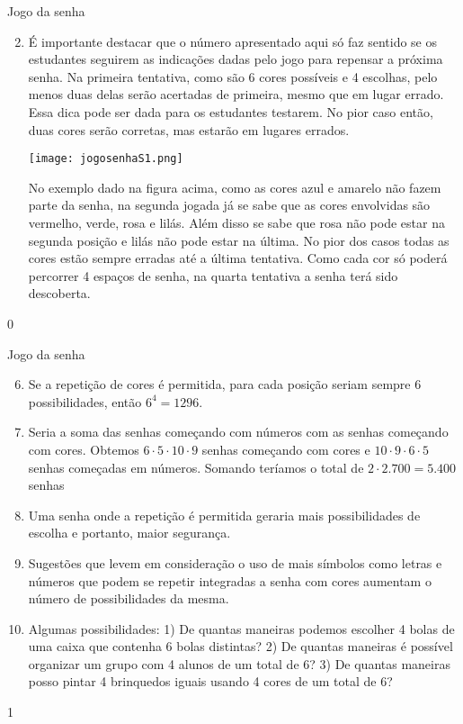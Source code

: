 \begin{answer}{Jogo da senha}
{
\begin{enumerate}\setcounter{enumi}{1}
\item É importante destacar que o número apresentado aqui só faz sentido se os estudantes seguirem as indicações dadas pelo jogo para repensar a próxima senha. 
Na primeira tentativa, como são 6 cores possíveis e 4 escolhas, pelo menos duas delas serão acertadas de primeira, mesmo que em lugar errado. Essa dica pode ser dada para os estudantes testarem. No pior caso então, duas cores serão corretas, mas estarão em lugares errados.

\begin{center}
\texttt{[image: jogosenhaS1.png]}
\end{center}
No exemplo dado na figura acima, como as cores azul e amarelo não fazem parte da senha, na segunda jogada já se sabe que as cores envolvidas são vermelho, verde, rosa e lilás. Além disso se sabe que rosa não pode estar na segunda posição e lilás não pode estar na última. No pior dos casos todas as cores estão sempre erradas até a última tentativa. Como cada cor só poderá percorrer 4 espaços de senha, na quarta tentativa a senha terá sido descoberta. 
\end{enumerate}
}{0}
\end{answer}
\clearmargin
\begin{answer}{Jogo da senha}
{
\begin{enumerate}\setcounter{enumi}{5}
\item Se a repetição de cores é permitida, para cada posição seriam sempre 6 possibilidades, então $6^4=1296.$

\item Seria a soma das senhas começando com números com as senhas começando com cores. Obtemos  $6 \cdot 5 \cdot  10 \cdot 9 $ senhas começando com cores e $10 \cdot 9 \cdot 6 \cdot 5$ senhas começadas em números. Somando teríamos o total de $2 \cdot 2.700= 5.400$ senhas 

\item Uma senha onde a repetição é permitida geraria mais possibilidades de escolha e portanto, maior segurança.

\item Sugestões que levem em consideração o uso de mais símbolos como letras e números que podem se repetir integradas a senha com cores  aumentam o número de possibilidades da mesma.

\item Algumas possibilidades: 1) De quantas maneiras podemos escolher 4 bolas de uma caixa que contenha 6 bolas distintas? 2) De quantas maneiras é possível organizar um grupo com 4 alunos de um total de 6? 3) De quantas maneiras posso pintar 4 brinquedos iguais usando 4 cores de um total de 6?
\end{enumerate}
}{1}
\end{answer}

